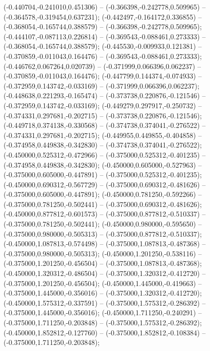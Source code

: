  (-0.440704,-0.241010,0.451306) -- (-0.366398,-0.242778,0.509965) -- (-0.364578,-0.319454,0.637231);
 (-0.442497,-0.164172,0.336855) -- (-0.368054,-0.165744,0.388579) -- (-0.366398,-0.242778,0.509965);
 (-0.444107,-0.087113,0.226814) -- (-0.369543,-0.088461,0.273333) -- (-0.368054,-0.165744,0.388579);
 (-0.445530,-0.009933,0.121381) -- (-0.370859,-0.011043,0.164476) -- (-0.369543,-0.088461,0.273333);
 (-0.446762,0.067264,0.020739) -- (-0.371999,0.066396,0.062237) -- (-0.370859,-0.011043,0.164476);
 (-0.447799,0.144374,-0.074933) -- (-0.372959,0.143742,-0.033169) -- (-0.371999,0.066396,0.062237);
 (-0.448638,0.221293,-0.165474) -- (-0.373738,0.220876,-0.121546) -- (-0.372959,0.143742,-0.033169);
 (-0.449279,0.297917,-0.250732) -- (-0.374331,0.297681,-0.202715) -- (-0.373738,0.220876,-0.121546);
 (-0.449718,0.374138,-0.330568) -- (-0.374738,0.374041,-0.276522) -- (-0.374331,0.297681,-0.202715);
 (-0.449955,0.449855,-0.404858) -- (-0.374958,0.449838,-0.342830) -- (-0.374738,0.374041,-0.276522);
 (-0.450000,0.525312,-0.472966) -- (-0.375000,0.525312,-0.401235) -- (-0.374958,0.449838,-0.342830);
 (-0.450000,0.605000,-0.527963) -- (-0.375000,0.605000,-0.447891) -- (-0.375000,0.525312,-0.401235);
 (-0.450000,0.690312,-0.567729) -- (-0.375000,0.690312,-0.481626) -- (-0.375000,0.605000,-0.447891);
 (-0.450000,0.781250,-0.592266) -- (-0.375000,0.781250,-0.502441) -- (-0.375000,0.690312,-0.481626);
 (-0.450000,0.877812,-0.601573) -- (-0.375000,0.877812,-0.510337) -- (-0.375000,0.781250,-0.502441);
 (-0.450000,0.980000,-0.595650) -- (-0.375000,0.980000,-0.505313) -- (-0.375000,0.877812,-0.510337);
 (-0.450000,1.087813,-0.574498) -- (-0.375000,1.087813,-0.487368) -- (-0.375000,0.980000,-0.505313);
 (-0.450000,1.201250,-0.538116) -- (-0.375000,1.201250,-0.456504) -- (-0.375000,1.087813,-0.487368);
 (-0.450000,1.320312,-0.486504) -- (-0.375000,1.320312,-0.412720) -- (-0.375000,1.201250,-0.456504);
 (-0.450000,1.445000,-0.419663) -- (-0.375000,1.445000,-0.356016) -- (-0.375000,1.320312,-0.412720);
 (-0.450000,1.575312,-0.337591) -- (-0.375000,1.575312,-0.286392) -- (-0.375000,1.445000,-0.356016);
 (-0.450000,1.711250,-0.240291) -- (-0.375000,1.711250,-0.203848) -- (-0.375000,1.575312,-0.286392);
 (-0.450000,1.852812,-0.127760) -- (-0.375000,1.852812,-0.108384) -- (-0.375000,1.711250,-0.203848);
